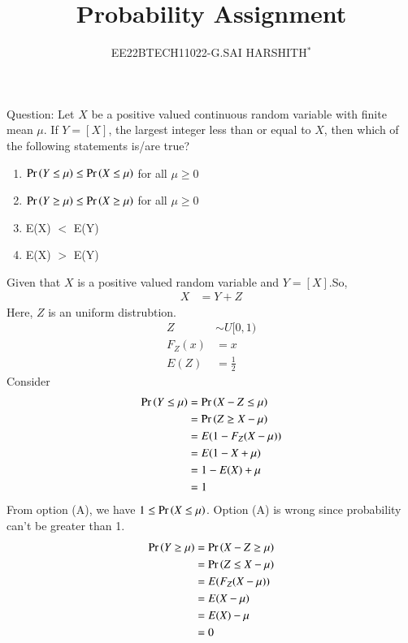\documentclass[journal,12pt,twocolumn]{IEEEtran}
\theoremstyle{remark}
\begin{document}

\vspace{3cm}

\title{Probability Assignment}
\author{EE22BTECH11022-G.SAI HARSHITH$^{*}$%
}
\maketitle
\newpage
\bigskip
\renewcommand{\thefigure}{\theenumi}
\renewcommand{\thetable}{\theenumi}

Question: Let $X$ be a positive valued continuous random variable with finite mean $\mu$.
If $Y=[X]$, the largest integer less than or equal to $X$, then which of the
following statements is/are true?
\begin{enumerate}[label=(\Alph*)]
\item $\Pr\left(Y \leq \mu\right) \leq \Pr\left(X \leq \mu\right)$ for all $\mu \geq 0$
\item $\Pr\left(Y \geq \mu\right) \leq \Pr\left(X \geq \mu\right)$ for all $\mu \geq 0$
\item E(X) $<$ E(Y)
\item E(X) $>$ E(Y)
\end{enumerate}
\solution Given that $X$ is a positive valued random variable and $Y=[X]$.So,
\begin{align}
X&=Y+Z
\end{align}
Here, $Z$ is an uniform distrubtion.
\begin{align}
Z &\sim U[0,1)\\
F_Z(x)&=x\\
E(Z)&=\frac{1}{2}
\end{align}
Consider
\begin{align}
\Pr\left(Y \leq \mu\right)&=\Pr\left(X-Z \leq \mu\right)\\
&=\Pr\left(Z \geq X-\mu\right)\\
&=E(1-F_Z(X-\mu))\\
&=E(1-X+\mu)\\
&=1-E(X)+\mu\\
&=1
\end{align}
From option (A), we have $1 \leq \Pr\left(X \leq \mu\right)$. Option (A) is wrong since probability can't be greater than 1.
\begin{align}
\Pr\left(Y \geq \mu\right)&=\Pr\left(X-Z \geq \mu\right)\\
&=\Pr\left(Z \leq X-\mu\right)\\
&=E(F_Z(X-\mu))\\
&=E(X-\mu)\\
&=E(X)-\mu\\
&=0
\end{align}
\end{document}
